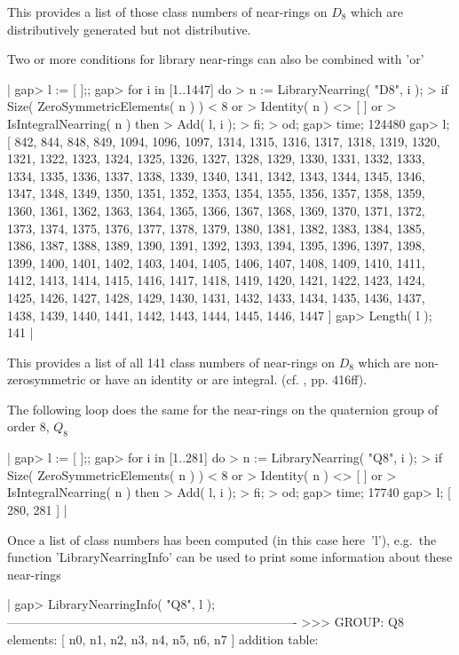 This provides a list of those class numbers of near-rings on $D_8$ which
are distributively generated but not distributive.

Two or more conditions for library near-rings can also be combined with 
'or'\:\

|  gap> l := [ ];;           
  gap> for i in [1..1447] do
  >      n := LibraryNearring( "D8", i );
  >      if Size( ZeroSymmetricElements( n ) ) < 8 or
  >         Identity( n ) <> [ ] or
  >         IsIntegralNearring( n ) then
  >           Add( l, i );
  >      fi;
  >    od;
  gap> time;
  124480
  gap> l;
  [ 842, 844, 848, 849, 1094, 1096, 1097, 1314, 1315, 1316, 1317, 1318, 
    1319, 1320, 1321, 1322, 1323, 1324, 1325, 1326, 1327, 1328, 1329, 
    1330, 1331, 1332, 1333, 1334, 1335, 1336, 1337, 1338, 1339, 1340, 
    1341, 1342, 1343, 1344, 1345, 1346, 1347, 1348, 1349, 1350, 1351, 
    1352, 1353, 1354, 1355, 1356, 1357, 1358, 1359, 1360, 1361, 1362, 
    1363, 1364, 1365, 1366, 1367, 1368, 1369, 1370, 1371, 1372, 1373, 
    1374, 1375, 1376, 1377, 1378, 1379, 1380, 1381, 1382, 1383, 1384, 
    1385, 1386, 1387, 1388, 1389, 1390, 1391, 1392, 1393, 1394, 1395, 
    1396, 1397, 1398, 1399, 1400, 1401, 1402, 1403, 1404, 1405, 1406, 
    1407, 1408, 1409, 1410, 1411, 1412, 1413, 1414, 1415, 1416, 1417, 
    1418, 1419, 1420, 1421, 1422, 1423, 1424, 1425, 1426, 1427, 1428, 
    1429, 1430, 1431, 1432, 1433, 1434, 1435, 1436, 1437, 1438, 1439, 
    1440, 1441, 1442, 1443, 1444, 1445, 1446, 1447 ]
  gap> Length( l );
  141
|

This provides a list of all 141 class numbers of near-rings on $D_8$ which
are non-zerosymmetric or have an identity or are integral. 
(cf. \cite{Pil83}, pp. 416ff).

The following loop does the same for the near-rings on the quaternion group
of order 8, $Q_8$\:\

|  gap> l := [ ];;
  gap> for i in [1..281] do
  >      n := LibraryNearring( "Q8", i );
  >      if Size( ZeroSymmetricElements( n ) ) < 8 or
  >        Identity( n ) <> [ ] or
  >          IsIntegralNearring( n ) then
  >          Add( l, i );
  >      fi;
  >    od;
  gap> time;
  17740
  gap> l;
  [ 280, 281 ]
|

Once a list of class numbers has been computed (in this case here\:\ 'l'),
e.g.\ the function 'Library\-Near\-ring\-Info' can be used to print
some information about these near-rings\:\

|  gap> LibraryNearringInfo( "Q8", l );
  ----------------------------------------------------------------------
  >>> GROUP: Q8
  elements: [ n0, n1, n2, n3, n4, n5, n6, n7 ]
  addition table:

